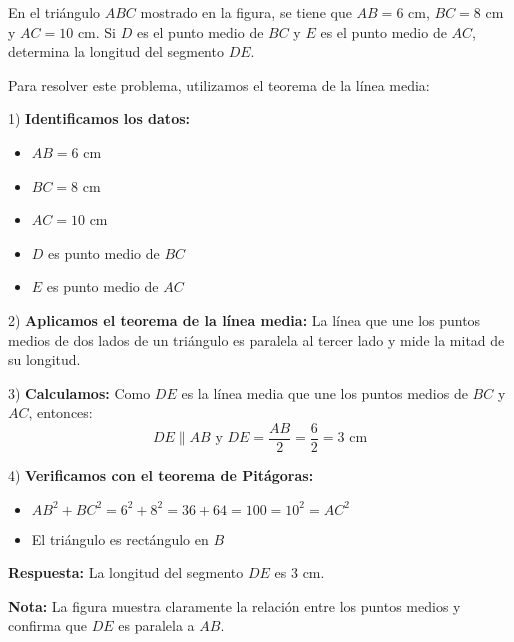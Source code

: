\begin{ejercicio}[
  id=GEO_TRI_001,
  materia=geometria,
  capitulo=triangulos,
  nivel=intermedio,
  procedencia="Examen UNI 2024",
  visibilidad=true,
  libros={geometria_pre, geometria_avanzado},
  youtube_url="https://www.youtube.com/watch?v=ejemplo_geometria_tri",
  mostrar_solucion=true,
  libro_promocion=""
]
En el triángulo $ABC$ mostrado en la figura, se tiene que $AB = 6$ cm, $BC = 8$ cm y $AC = 10$ cm. Si $D$ es el punto medio de $BC$ y $E$ es el punto medio de $AC$, determina la longitud del segmento $DE$.

\begin{center}
\end{center}

\begin{solucion}
Para resolver este problema, utilizamos el teorema de la línea media:

1) \textbf{Identificamos los datos:}
   \begin{itemize}
   \item $AB = 6$ cm
   \item $BC = 8$ cm
   \item $AC = 10$ cm
   \item $D$ es punto medio de $BC$
   \item $E$ es punto medio de $AC$
   \end{itemize}

2) \textbf{Aplicamos el teorema de la línea media:}
   La línea que une los puntos medios de dos lados de un triángulo es paralela al tercer lado y mide la mitad de su longitud.

3) \textbf{Calculamos:}
   Como $DE$ es la línea media que une los puntos medios de $BC$ y $AC$, entonces:
   $$DE \parallel AB \text{ y } DE = \frac{AB}{2} = \frac{6}{2} = 3 \text{ cm}$$

4) \textbf{Verificamos con el teorema de Pitágoras:}
   \begin{itemize}
   \item $AB^2 + BC^2 = 6^2 + 8^2 = 36 + 64 = 100 = 10^2 = AC^2$
   \item El triángulo es rectángulo en $B$
   \end{itemize}

\textbf{Respuesta:} La longitud del segmento $DE$ es $3$ cm.

\textbf{Nota:} La figura muestra claramente la relación entre los puntos medios y confirma que $DE$ es paralela a $AB$.
\end{solucion}
\end{ejercicio} 